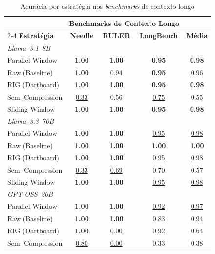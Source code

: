 \begin{table}[htbp]
    \centering
    \caption{Acurácia por estratégia nos \textit{benchmarks} de contexto longo}
    \label{tab:benchmark-results}
    \begin{tabular}{lccc|c}
    \toprule
    & \multicolumn{3}{c}{\textbf{Benchmarks de Contexto Longo}} & \\
    \cmidrule(lr){2-4}
    \textbf{Estratégia} & \textbf{Needle} & \textbf{RULER} & \textbf{LongBench} & \textbf{Média} \\
    \midrule
    \multicolumn{5}{l}{\textit{Llama~3.1~8B}} \\
    Parallel Window    & \textbf{1.00} & \textbf{1.00}     & \textbf{0.95} & \textbf{0.98} \\
    Raw (Baseline)     & \textbf{1.00} & \underline{0.94}  & \textbf{0.95} & \underline{0.96} \\
    RIG (Dartboard)    & \textbf{1.00} & \textbf{1.00}     & \textbf{0.95} & \textbf{0.98} \\
    Sem. Compression   & \underline{0.33} & 0.56           & \underline{0.75} & 0.55 \\
    Sliding Window     & \textbf{1.00} & \textbf{1.00}     & \textbf{0.95} & \textbf{0.98} \\
    \midrule
    \multicolumn{5}{l}{\textit{Llama~3.3~70B}} \\
    Parallel Window    & \textbf{1.00} & \textbf{1.00} & \underline{0.95} & \underline{0.98} \\
    Raw (Baseline)     & \textbf{1.00} & \textbf{1.00} & \textbf{1.00}    & \textbf{1.00} \\
    RIG (Dartboard)    & \textbf{1.00} & \textbf{1.00} & \underline{0.95} & \underline{0.98} \\
    Sem. Compression   & \underline{0.33} & \underline{0.69} & 0.70      & 0.57 \\
    Sliding Window     & \textbf{1.00} & \textbf{1.00} & \underline{0.95} & \underline{0.98} \\
    \midrule
    \multicolumn{5}{l}{\textit{GPT-OSS~20B}} \\
    Parallel Window    & \textbf{1.00} & \textbf{1.00}    & \underline{0.92} & \underline{0.97} \\
    Raw (Baseline)     & \textbf{1.00} & \textbf{1.00}    & 0.83             & 0.94 \\
    RIG (Dartboard)    & \textbf{1.00} & \underline{0.00} & \underline{0.92} & 0.64 \\
    Sem. Compression   & \underline{0.80} & \underline{0.00} & 0.33          & 0.38 \\

\end{tabular}
\end{table}
